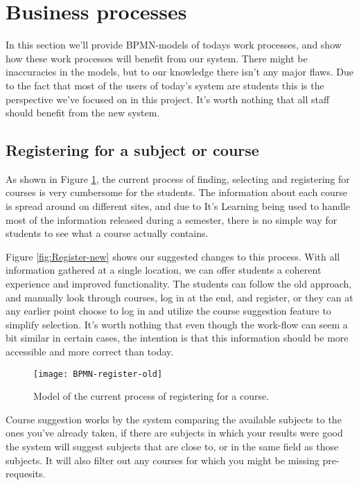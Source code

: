 \section{Business processes}
	In this section we'll provide BPMN-models \cite{bpmn} of todays work processes, and show how these work processes will benefit from our system. There might be inaccuracies in 
    the models, but to our knowledge there isn't any major flaws. Due to the fact that most of the users of today's system are students this is the perspective we've focused on in this project. It's worth nothing that all staff should benefit from the new system.

\subsection{Registering for a subject or course}
	As shown in Figure \ref{fig:Register-old}, the current process of finding, selecting and registering for courses is very cumbersome for the students.
The information about each course is spread around on different sites, and due to It's Learning being used to handle most of the information released during a semester,
there is no simple way for students to see what a course actually contains.

Figure \ref{fig:Register-new} shows our suggested changes to this process.
With all information gathered at a single location, we can offer students a coherent experience and improved functionality.
The students can follow the old approach, and manually look through courses, log in at the end, and register,
or they can at any earlier point choose to log in and utilize the course suggestion feature to simplify selection. It's worth nothing that even though the work-flow can seem a bit similar in certain cases, the intention is that this information should be more accessible and more correct than today.\\ 
\begin{figure}[H]
    \centering
    \texttt{[image: BPMN-register-old]}%
    \caption{Model of the current process of registering for a course.}
    \label{fig:Register-old}
\end{figure}
\noindent
Course suggestion works by the system comparing the available subjects to the ones you've already taken, if there are subjects in which your results were good the system will
suggest subjects that are close to, or in the same field as those subjects. It will also filter out any courses for which you might be missing pre-requesits.\\

